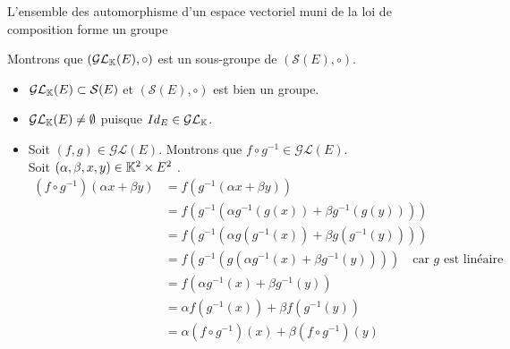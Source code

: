 \documentclass{article}
\renewenvironment{question_kholle}[2][ ]
{
	\subsection{\texorpdfstring{#2}{}}
	\notblank{#1}
	{
		\noindent #1
		\bigbreak
	}
	{}
	\begin{proof}
}
{
	\end{proof}
}
\begin{document}
	\begin{question_kholle}
		{L'ensemble des automorphisme d'un espace vectoriel muni de la loi de composition forme un groupe}

		Montrons que $(\mathcal{GL}_{\mathbb K}(E), \circ)$ est un sous-groupe de $(\mathcal{S}(E), \circ)$.
		\begin{itemize}
			\item $\mathcal{GL}_{\mathbb K}(E) \subset \mathcal{S}(E)$ et $(\mathcal{S}(E), \circ)$ est bien un groupe.
			\item $\mathcal{GL}_{\mathbb K}(E) \neq \emptyset$ puisque $Id_E \in \mathcal{GL}_{\mathbb K}$.
			\item Soit $(f, g) \in \mathcal{GL}(E)$. Montrons que $f \circ g^{-1} \in \mathcal{GL}(E)$. \\
			Soit $(\alpha, \beta, x, y) \in \mathbb K^2 \times E^2$ \fqs. \\
			\begin{equation*}
				\begin{aligned}
					\left(f \circ g^{-1}\right) \left(\alpha x + \beta y\right)
					&= f \left( g^{-1} \left(\alpha x + \beta y\right) \right) \\
					&= f \left( g^{-1} \left(\alpha g^{-1}(g(x)) + \beta g^{-1}(g(y))\right) \right) \\
					&= f \left( g^{-1} \left( \alpha g\left(g^{-1}(x)\right) + \beta g\left(g^{-1}(y)\right) \right) \right) \\
					&= f \left( g^{-1} \left( g \left( \alpha g^{-1}(x) + \beta g^{-1}(y) \right) \right) \right) \quad \text{car } g \text{ est linéaire} \\
					&= f \left( \alpha g^{-1}(x) + \beta g^{-1}(y) \right) \\
					&= \alpha f \left( g^{-1}(x) \right) + \beta f \left( g^{-1}(y) \right) \\
					&= \alpha \left(f \circ g^{-1}\right) (x) + \beta \left(f \circ g^{-1}\right) (y)
				\end{aligned}
			\end{equation*}
		\end{itemize}
	\end{question_kholle}
\end{document}
